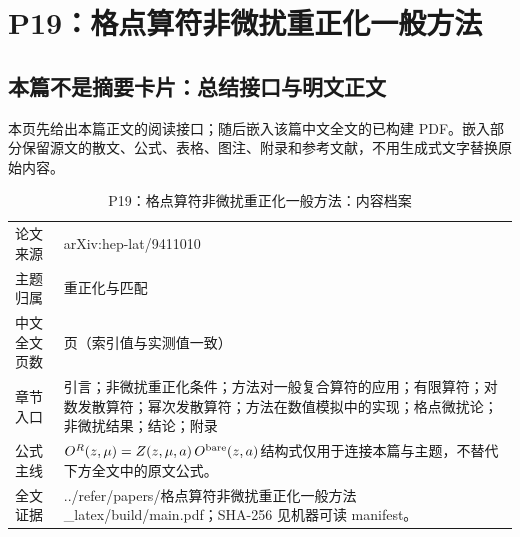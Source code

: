\documentclass[UTF8,11pt,oneside]{ctexbook}
\begin{document}
\chapter{P19：格点算符非微扰重正化一般方法}
\section*{本篇不是摘要卡片：总结接口与明文正文}
本页先给出本篇正文的阅读接口；随后嵌入该篇中文全文的已构建 PDF。嵌入部分保留源文的散文、公式、表格、图注、附录和参考文献，不用生成式文字替换原始内容。
\begin{table}[htbp]
  \centering
  \caption{P19：格点算符非微扰重正化一般方法：内容档案}
  \small
  \begin{tabularx}{0.96\textwidth}{@{}p{3.3cm}>{\raggedright\arraybackslash}X@{}}
    \toprule
    论文来源 & arXiv:hep-lat/9411010 \\
    主题归属 & 重正化与匹配 \\
    中文全文页数 & 26 页（索引值与实测值一致） \\
    章节入口 & 引言；非微扰重正化条件；方法对一般复合算符的应用；有限算符；对数发散算符；幂次发散算符；方法在数值模拟中的实现；格点微扰论；非微扰结果；结论；附录 \\
    公式主线 & $O^{R}(z,\mu)=Z(z,\mu,a)\,O^{\rm bare}(z,a)$\newline\scriptsize 结构式仅用于连接本篇与主题，不替代下方全文中的原文公式。 \\
    全文证据 & ../\allowbreak{}refer/\allowbreak{}papers/\allowbreak{}格点算符非微扰重正化一般方法\_\allowbreak{}latex/\allowbreak{}build/\allowbreak{}main.pdf；SHA-256 见机器可读 manifest。 \\
    \bottomrule
  \end{tabularx}
\end{table}
\end{document}
